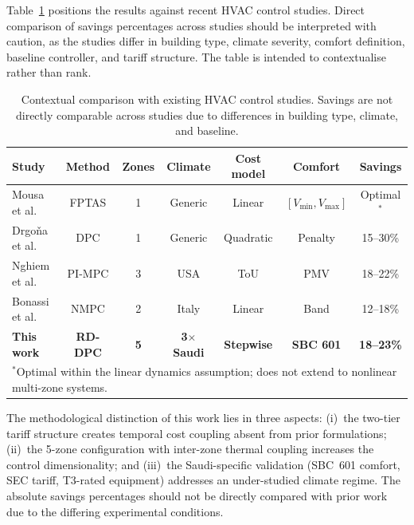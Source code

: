 \documentclass[12pt]{article}
\theoremstyle{plain}
\theoremstyle{definition}
\begin{document}
Table~\ref{tab:literature} positions the results against recent HVAC control studies. Direct comparison of savings percentages across studies should be interpreted with caution, as the studies differ in building type, climate severity, comfort definition, baseline controller, and tariff structure. The table is intended to contextualise rather than rank.

\begin{table}[H]
\centering
\caption{Contextual comparison with existing HVAC control studies. Savings are not directly comparable across studies due to differences in building type, climate, and baseline.}\label{tab:literature}
\begin{tabular*}{\textwidth}{@{\extracolsep{\fill}}lcccccc}
\toprule
Study & Method & Zones & Climate & Cost model & Comfort & Savings \\
\midrule
Mousa et al. \cite{mousa2018optimal} & FPTAS & 1 & Generic & Linear & $[V_{\min},V_{\max}]$ & Optimal$^*$ \\
Drgo\v{n}a et al. \cite{drgona2024dpc} & DPC & 1 & Generic & Quadratic & Penalty & 15--30\% \\
Nghiem et al. \cite{nghiem2023physics} & PI-MPC & 3 & USA & ToU & PMV & 18--22\% \\
Bonassi et al. \cite{bonassi2024nonlinear} & NMPC & 2 & Italy & Linear & Band & 12--18\% \\
\midrule
\textbf{This work} & \textbf{RD-DPC} & \textbf{5} & \textbf{3$\times$Saudi} & \textbf{Stepwise} & \textbf{SBC 601} & \textbf{18--23\%} \\
\bottomrule
\multicolumn{7}{l}{\footnotesize $^*$Optimal within the linear dynamics assumption; does not extend to nonlinear multi-zone systems.}
\end{tabular*}
\end{table}

The methodological distinction of this work lies in three aspects: (i)~the two-tier tariff structure creates temporal cost coupling absent from prior formulations; (ii)~the 5-zone configuration with inter-zone thermal coupling increases the control dimensionality; and (iii)~the Saudi-specific validation (SBC~601 comfort, SEC tariff, T3-rated equipment) addresses an under-studied climate regime. The absolute savings percentages should not be directly compared with prior work due to the differing experimental conditions.
\end{document}
